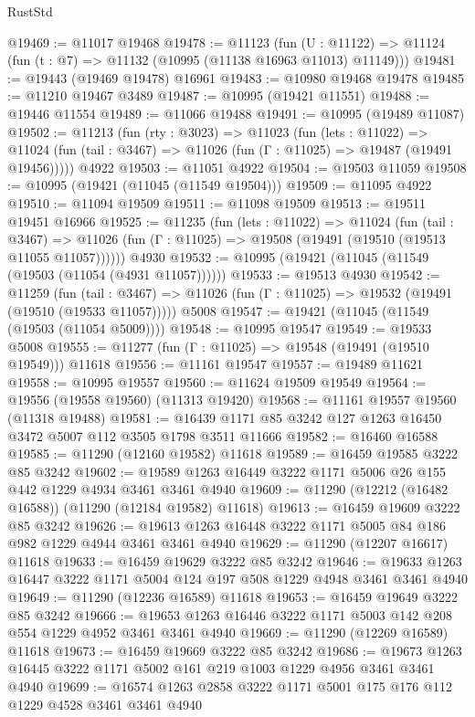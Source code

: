 \begin{lexlean}{RustStd}
\begin{coremodule}
@19469 := @11017 @19468
@19478 := @11123
    (fun (U : @11122) => @11124 (fun (t : @7) => @11132 (@10995 (@11138 @16963 @11013) @11149)))
@19481 := @19443 (@19469 @19478) @16961
@19483 := @10980 @19468 @19478
@19485 := @11210 @19467 @3489
@19487 := @10995 (@19421 @11551)
@19488 := @19446 @11554
@19489 := @11066 @19488
@19491 := @10995 (@19489 @11087)
@19502 := @11213
    (fun (rty : @3023) =>
    @11023
      (fun (lets : @11022) =>
      @11024 (fun (tail : @3467) => @11026 (fun (Γ : @11025) => @19487 (@19491 @19456)))))
    @4922
@19503 := @11051 @4922
@19504 := @19503 @11059
@19508 := @10995 (@19421 (@11045 (@11549 @19504)))
@19509 := @11095 @4922
@19510 := @11094 @19509
@19511 := @11098 @19509
@19513 := @19511 @19451 @16966
@19525 := @11235
    (fun (lets : @11022) =>
    @11024
      (fun (tail : @3467) =>
      @11026 (fun (Γ : @11025) => @19508 (@19491 (@19510 (@19513 @11055 @11057))))))
    @4930
@19532 := @10995 (@19421 (@11045 (@11549 (@19503 (@11054 (@4931 @11057))))))
@19533 := @19513 @4930
@19542 := @11259
    (fun (tail : @3467) => @11026 (fun (Γ : @11025) => @19532 (@19491 (@19510 (@19533 @11057)))))
    @5008
@19547 := @19421 (@11045 (@11549 (@19503 (@11054 @5009))))
@19548 := @10995 @19547
@19549 := @19533 @5008
@19555 := @11277 (fun (Γ : @11025) => @19548 (@19491 (@19510 @19549))) @11618
@19556 := @11161 @19547
@19557 := @19489 @11621
@19558 := @10995 @19557
@19560 := @11624 @19509 @19549
@19564 := @19556 (@19558 @19560) (@11313 @19420)
@19568 := @11161 @19557 @19560 (@11318 @19488)
@19581 := @16439 @1171 @85 @3242 @127 @1263 @16450 @3472 @5007 @112 @3505 @1798 @3511 @11666
@19582 := @16460 @16588
@19585 := @11290 (@12160 @19582) @11618
@19589 := @16459 @19585 @3222 @85 @3242
@19602 := @19589 @1263 @16449 @3222 @1171 @5006 @26 @155 @442 @1229 @4934 @3461 @3461 @4940
@19609 := @11290 (@12212 (@16482 @16588)) (@11290 (@12184 @19582) @11618)
@19613 := @16459 @19609 @3222 @85 @3242
@19626 := @19613 @1263 @16448 @3222 @1171 @5005 @84 @186 @982 @1229 @4944 @3461 @3461 @4940
@19629 := @11290 (@12207 @16617) @11618
@19633 := @16459 @19629 @3222 @85 @3242
@19646 := @19633 @1263 @16447 @3222 @1171 @5004 @124 @197 @508 @1229 @4948 @3461 @3461 @4940
@19649 := @11290 (@12236 @16589) @11618
@19653 := @16459 @19649 @3222 @85 @3242
@19666 := @19653 @1263 @16446 @3222 @1171 @5003 @142 @208 @554 @1229 @4952 @3461 @3461 @4940
@19669 := @11290 (@12269 @16589) @11618
@19673 := @16459 @19669 @3222 @85 @3242
@19686 := @19673 @1263 @16445 @3222 @1171 @5002 @161 @219 @1003 @1229 @4956 @3461 @3461 @4940
@19699 := @16574 @1263 @2858 @3222 @1171 @5001 @175 @176 @112 @1229 @4528 @3461 @3461 @4940

\end{coremodule}
\end{lexlean}
